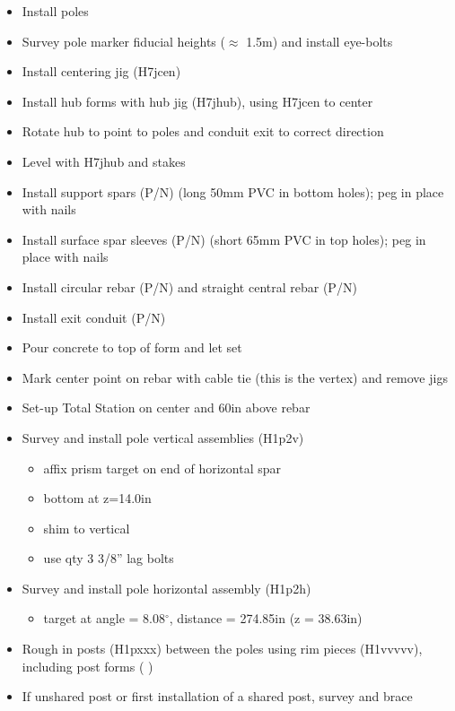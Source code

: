 \documentclass[11pt]{article}
\begin{document}
\renewcommand{\labelitemi}{$\boxempty$}
\renewcommand{\labelitemii}{$\boxempty$}
\begin{itemize}
\item Install poles
\item Survey pole marker fiducial heights ($\approx$ 1.5m) and install eye-bolts
\item Install centering jig (H7jcen)
\item Install hub forms with hub jig (H7jhub), using H7jcen to center
\item Rotate hub to point to poles and conduit exit to correct direction
\item Level with H7jhub and stakes
\item Install support spars (P/N) (long 50mm PVC in bottom holes); peg in place with nails 
\item Install surface spar sleeves (P/N) (short 65mm PVC in top holes); peg in place with nails
\item Install circular rebar (P/N) and straight central rebar (P/N)
\item Install exit conduit (P/N)
\item Pour concrete to top of form and let set
\item Mark center point on rebar with cable tie (this is the vertex) and remove jigs
\item Set-up Total Station on center and 60in above rebar
\item Survey and install pole vertical assemblies (H1p2v)
	\begin{itemize}
	\item affix prism target on end of horizontal spar
	\item bottom at z=14.0in
	\item shim to vertical
	\item use qty 3 3/8'' lag bolts
	\end{itemize}
\item Survey and install pole horizontal assembly (H1p2h)
	\begin{itemize}
	\item target at angle = 8.08$^\circ$, distance = 274.85in (z = 38.63in)
	\end{itemize}
\item Rough in posts (H1pxxx) between the poles using rim pieces (H1vvvvv), including post forms (   )
\item If unshared post or first installation of a shared post, survey and brace
	\begin{itemize}

\end{itemize}
\end{itemize}
\end{document}
